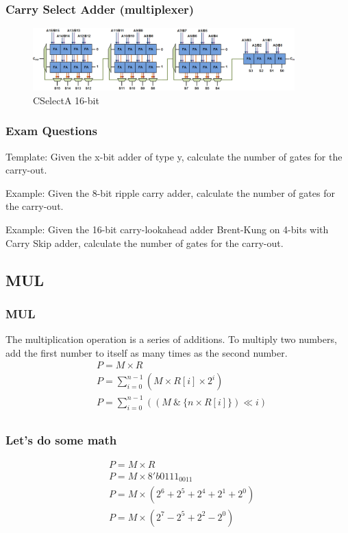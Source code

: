 \begin{frame}
    \frametitle{Carry Select Adder (multiplexer)}
    \begin{figure}
        \centering
        \includegraphics[width=0.9\textwidth]{media/Carry-select-adder-fixed-size.png}
        \caption{CSelectA 16-bit}
    \end{figure}
\end{frame}

\begin{frame}
    \frametitle{Exam Questions}
 Template: Given the x-bit adder of type y, calculate the number of gates for the carry-out.

 Example: Given the 8-bit ripple carry adder, calculate the number of gates for the carry-out.

 Example: Given the 16-bit carry-lookahead adder Brent-Kung on 4-bits with Carry Skip adder, calculate the number of gates for the carry-out.
\end{frame}

\subsection{MUL}

\begin{frame}
    \frametitle{MUL}
 The multiplication operation is a series of additions. To multiply two numbers, add the first number to itself as many times as the second number.
    \begin{equation}
        \begin{aligned}
            &P = M \times R\\
            &P=\sum_{i=0}^{n-1} (M \times R[i] \times 2^i)\\
            &P=\sum_{i=0}^{n-1} ((M \ \& \ \{n \times R[i]\}) \ll i)\\
        \end{aligned}
    \end{equation}
\end{frame}

\begin{frame}
    \frametitle{Let's do some math}
    \begin{equation}
        \begin{aligned}
            &P = M \times R\\
            &P = M \times 8'b0111_0011\\
            &P = M \times (2^6 + 2^5 + 2^4 + 2^1 + 2^0)\\
            &P = M \times (2^7 - 2^5 + 2^2 - 2^0)\\
        \end{aligned}
    \end{equation}
\end{frame}

